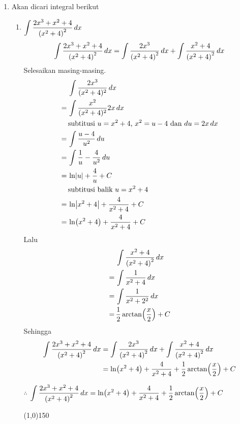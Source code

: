 \begin{enumerate}[leftmargin=*, label={\arabic*}.]
\item Akan dicari integral berikut
    \begin{enumerate}[label={\alph*}.]
    \item $\ds \int\frac{2x^{3}+x^{2}+4}{\brk*{x^{2}+4}^{2}}\,dx$
    \[
        \int\frac{2x^{3}+x^{2}+4}{\brk*{x^{2}+4}^{2}}\,dx
        = \int\frac{2x^{3}}{\brk*{x^{2}+4}^{2}}\,dx
        +\int\frac{x^{2}+4}{\brk*{x^{2}+4}^{2}}\,dx
    \]
    Selesaikan masing-masing.
    \begin{align*}
        &\int \frac{2x^{3}}{(x^{2}+4)^2}\,dx\\
        =\,&\int \frac{x^{2}}{(x^{2}+4)^2}2x\,dx\\
        &\text{subtitusi $u=x^{2}+4$, $x^{2}=u-4$ dan $du = 2x\,dx$}\\
        =\,&\int \frac{u-4}{u^2}\,du\\
        =\,&\int \frac{1}{u}-\frac{4}{u^{2}}\,du\\
        =\,&\ln\abs{u}+\frac{4}{u}+C\\
        &\text{subtitusi balik $u=x^{2}+4$}\\
        =\,&\ln\abs*{x^{2}+4}+\frac{4}{x^{2}+4}+C\\
        =\,&\ln\brk*{x^{2}+4}+\frac{4}{x^{2}+4}+C
    \end{align*}
    Lalu 
    \begin{align*}
        &\int\frac{x^{2}+4}{\brk*{x^{2}+4}^{2}}\,dx\\
        =\,&\int\frac{1}{x^{2}+4}\,dx\\
        =\,&\int\frac{1}{x^{2}+2^{2}}\,dx\\
        =\,&\frac{1}{2}\arctan\brk*{\frac{x}{2}}+C
    \end{align*}
    Sehingga 
    \begin{align*}
        \int\frac{2x^{3}+x^{2}+4}{\brk*{x^{2}+4}^{2}}\,dx
        &= \int\frac{2x^{3}}{\brk*{x^{2}+4}^{2}}\,dx
        +\int\frac{x^{2}+4}{\brk*{x^{2}+4}^{2}}\,dx\\
        &=\ln\brk*{x^{2}+4}+\frac{4}{x^{2}+4}+\frac{1}{2}\arctan\brk*{\frac{x}{2}}+C
    \end{align*}

    $\therefore$ $\ds \int\frac{2x^{3}+x^{2}+4}{\brk*{x^{2}+4}^{2}}\,dx
    =\ln\brk*{x^{2}+4}+\frac{4}{x^{2}+4}+\frac{1}{2}\arctan\brk*{\frac{x}{2}}+C$


\begin{center}\line(1,0){150}\end{center}



\end{enumerate}
\end{enumerate}
